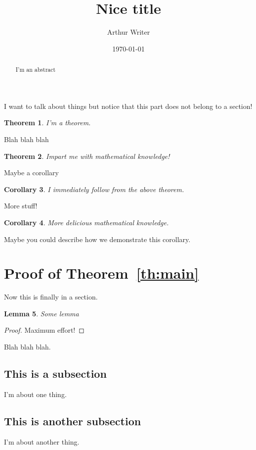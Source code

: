 \documentclass[11pt]{amsart}
\title[Hi]{Nice title}
\author{Arthur Writer}
\date{\today}
\newtheorem{theorem}{Theorem}
\newtheorem{lemma}[theorem]{Lemma}
\newtheorem{corollary}[theorem]{Corollary}
\theoremstyle{definition}
\begin{document}
\begin{abstract}
I'm an abstract
\end{abstract}


\maketitle

I want to talk about things but notice that this part does not belong to a section!

 \begin{theorem}\label{th:some_theorem}
I'm a theorem.
\end{theorem}

Blah blah blah

\begin{theorem}\label{th:some_other_theorem}
Impart me with mathematical knowledge!
\end{theorem}

Maybe a corollary

\begin{corollary}\label{cor:a_corollary}
I immediately follow from the above theorem.
\end{corollary}


More stuff!

\begin{corollary}\label{cor:another_corollary}
More delicious mathematical knowledge.
\end{corollary}

Maybe you could describe how we demonstrate this corollary.



\section{Proof of Theorem~\ref{th:main}}

Now this is finally in a section.

\begin{lemma}
Some lemma
\end{lemma}


\begin{proof}
Maximum effort!
\end{proof}

Blah blah blah.

\subsection{This is a subsection}

I'm about one thing.

\subsection{This is another subsection}

I'm about another thing.
\end{document}
